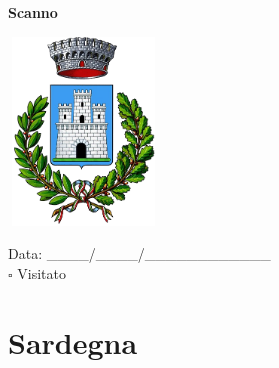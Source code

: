 \documentclass[a5paper,12pt]{article}
\begin{document}
\hfill
\vspace{0.7cm}
\noindent
\begin{minipage}[t]{0.45\textwidth}
    \begin{center}
        \textbf{Scanno}
    \end{center}
    \vspace{-0.5cm} %
    \begin{center}
        \includegraphics[height= 5cm, width=4cm]{Abruzzo/Scanno-Stemma.png}
    \end{center}
    \vspace{-0.4cm} %
    \begin{flushleft}
        Data: \_\_\_\_/\_\_\_\_/\_\_\_\_\_\_\_\_\_\_\_\_ \\
        $\square$ Visitato
    \end{flushleft}
\end{minipage}

\newpage

\section*{Sardegna}

\newpage
\end{document}
